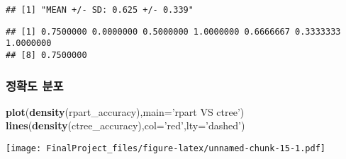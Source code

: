 \documentclass[]{article}
\newenvironment{Shaded}{\begin{snugshade}}{\end{snugshade}}
\newcommand{\KeywordTok}[1]{\textcolor[rgb]{0.13,0.29,0.53}{\textbf{#1}}}
\newcommand{\DataTypeTok}[1]{\textcolor[rgb]{0.13,0.29,0.53}{#1}}
\newcommand{\StringTok}[1]{\textcolor[rgb]{0.31,0.60,0.02}{#1}}
\newcommand{\OperatorTok}[1]{\textcolor[rgb]{0.81,0.36,0.00}{\textbf{#1}}}
\newcommand{\NormalTok}[1]{#1}
\begin{document}
\begin{Shaded}
\end{Shaded}

\begin{verbatim}
## [1] "MEAN +/- SD: 0.625 +/- 0.339"
\end{verbatim}

\begin{verbatim}
## [1] 0.7500000 0.0000000 0.5000000 1.0000000 0.6666667 0.3333333 1.0000000
## [8] 0.7500000
\end{verbatim}

\subsubsection{정확도 분포}\label{-}

\begin{Shaded}
\begin{Highlighting}[]
\KeywordTok{plot}\NormalTok{(}\KeywordTok{density}\NormalTok{(rpart_accuracy),}\DataTypeTok{main=}\StringTok{'rpart VS ctree'}\NormalTok{)}
\KeywordTok{lines}\NormalTok{(}\KeywordTok{density}\NormalTok{(ctree_accuracy),}\DataTypeTok{col=}\StringTok{'red'}\NormalTok{,}\DataTypeTok{lty=}\StringTok{'dashed'}\NormalTok{)}
\end{Highlighting}
\end{Shaded}

\texttt{[image: FinalProject\_files/figure-latex/unnamed-chunk-15-1.pdf]}
\end{document}
